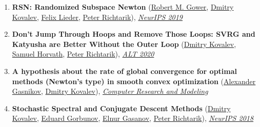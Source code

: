 \begin{enumerate}
\item \textbf{RSN: Randomized Subspace Newton} (\href{https://gowerrobert.github.io}{\color{linkcolour}Robert M. Gower}, \href{https://www.dmitry-kovalev.com}{\color{linkcolour}Dmitry Kovalev}, \href{http://www.opt.uni-duesseldorf.de/~lieder/de/inhalt.php}{\color{linkcolour}Felix Lieder}, \href{https://richtarik.org}{\color{linkcolour}Peter Richtarik}), \href{https://papers.nips.cc/paper/8351-rsn-randomized-subspace-newton}{\em \color{black}NeurIPS 2019}
\item \textbf{Don't Jump Through Hoops and Remove Those Loops: SVRG and Katyusha are Better Without the Outer Loop} (\href{https://www.dmitry-kovalev.com}{\color{linkcolour}Dmitry Kovalev}, \href{https://samuelhorvath.github.io}{\color{linkcolour}Samuel Horvath}, \href{https://richtarik.org}{\color{linkcolour}Peter Richtarik}), \href{http://proceedings.mlr.press/v117/kovalev20a}{\em \color{black}ALT 2020}
\item \textbf{A hypothesis about the rate of global convergence for optimal methods (Newton's type) in smooth convex optimization} (\href{https://scholar.google.ru/citations?user=AmeE8qkAAAAJ}{\color{linkcolour}Alexander Gasnikov}, \href{https://www.dmitry-kovalev.com}{\color{linkcolour}Dmitry Kovalev}), \href{http://crm-en.ics.org.ru/journal/article/2685/}{\em \color{black}Computer Research and Modeling}
\item \textbf{Stochastic Spectral and Conjugate Descent Methods} (\href{https://www.dmitry-kovalev.com}{\color{linkcolour}Dmitry Kovalev}, \href{https://eduardgorbunov.github.io}{\color{linkcolour}Eduard Gorbunov}, \href{https://elnurgasanov.com}{\color{linkcolour}Elnur Gasanov}, \href{https://richtarik.org}{\color{linkcolour}Peter Richtarik}), \href{https://papers.nips.cc/paper/7596-stochastic-spectral-and-conjugate-descent-methods}{\em \color{black}NeurIPS 2018}
\end{enumerate}
